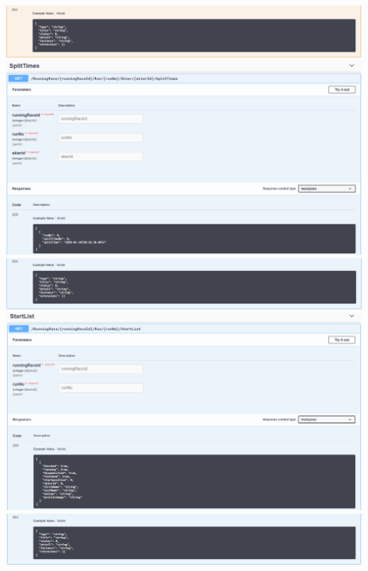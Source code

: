 \documentclass[a4paper, 12pt]{article}
\begin{document}
	\newline	
	\includegraphics[width=.7\textwidth]{img/Controller_skier_put_2.png}
	\newline	
	\includegraphics[width=.7\textwidth]{img/Controller_splitTimes_get_1.png}
	\newline
	\includegraphics[width=.7\textwidth]{img/Controller_splitTimes_get_2.png}
	\newline
	\includegraphics[width=.7\textwidth]{img/Controller_startList_get_1.png}
	\newline
	\includegraphics[width=.7\textwidth]{img/Controller_startList_get_2.png}
	\newline
\end{document}
